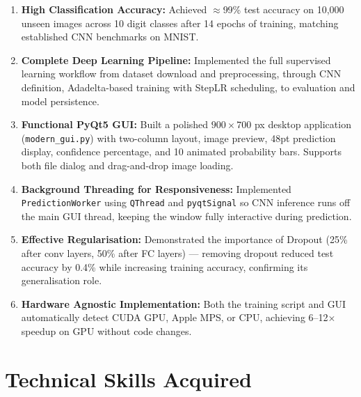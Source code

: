 \documentclass[12pt,a4paper,openany]{report}
\begin{document}
\begin{enumerate}
    \item \textbf{High Classification Accuracy:} Achieved $\approx$99\% test accuracy on 10,000 unseen images across 10 digit classes after 14 epochs of training, matching established CNN benchmarks on MNIST.

    \item \textbf{Complete Deep Learning Pipeline:} Implemented the full supervised learning workflow from dataset download and preprocessing, through CNN definition, Adadelta-based training with StepLR scheduling, to evaluation and model persistence.

    \item \textbf{Functional PyQt5 GUI:} Built a polished $900 \times 700$ px desktop application (\texttt{modern\_gui.py}) with two-column layout, image preview, 48pt prediction display, confidence percentage, and 10 animated probability bars. Supports both file dialog and drag-and-drop image loading.

    \item \textbf{Background Threading for Responsiveness:} Implemented \texttt{PredictionWorker} using \texttt{QThread} and \texttt{pyqtSignal} so CNN inference runs off the main GUI thread, keeping the window fully interactive during prediction.

    \item \textbf{Effective Regularisation:} Demonstrated the importance of Dropout (25\% after conv layers, 50\% after FC layers) --- removing dropout reduced test accuracy by 0.4\% while increasing training accuracy, confirming its generalisation role.

    \item \textbf{Hardware Agnostic Implementation:} Both the training script and GUI automatically detect CUDA GPU, Apple MPS, or CPU, achieving 6--12$\times$ speedup on GPU without code changes.
\end{enumerate}

\section{Technical Skills Acquired}
\end{document}
